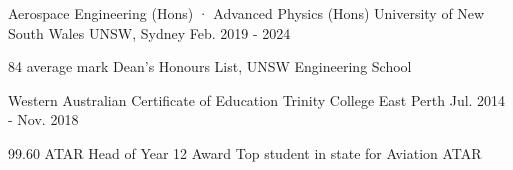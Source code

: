 

\begin{cventries}

\cventry
    {Aerospace Engineering (Hons) · Advanced Physics (Hons)} %
    {University of New South Wales} %
    {UNSW, Sydney} %
    {Feb. 2019 - 2024} %
    {
      \begin{cvitems} %
        \item {84 average mark \acvHeaderSocialSep Dean's Honours List, UNSW Engineering School}
      \end{cvitems}
    }
    
\cventry
    {Western Australian Certificate of Education} %
    {Trinity College} %
    {East Perth} %
    {Jul. 2014 - Nov. 2018} %
    {
      \begin{cvitems} %
        \item {99.60 ATAR \acvHeaderSocialSep Head of Year 12 Award \acvHeaderSocialSep Top student in state for Aviation ATAR}
      \end{cvitems}
    }

\end{cventries}
